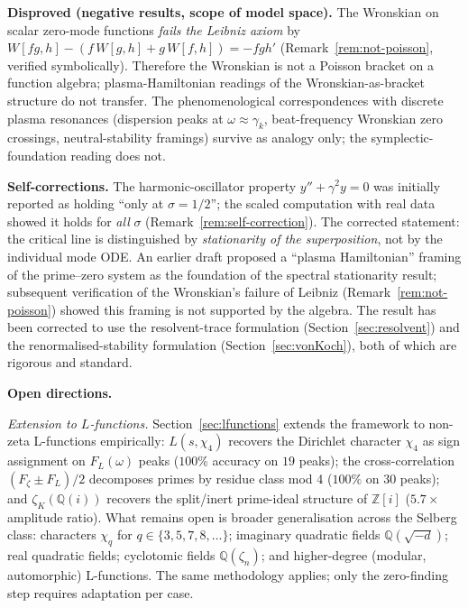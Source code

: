 \documentclass[11pt,a4paper]{article}
\theoremstyle{plain}
\theoremstyle{definition}
\theoremstyle{remark}
\begin{document}
\medskip
\noindent\textbf{Disproved (negative results, scope of model space).}
The Wronskian on scalar zero-mode functions \emph{fails the Leibniz
axiom} by $W[fg, h] - (f\,W[g,h] + g\,W[f,h]) = -fgh'$
(Remark~\ref{rem:not-poisson}, verified symbolically).  Therefore
the Wronskian is not a Poisson bracket on a function algebra;
plasma-Hamiltonian readings of the Wronskian-as-bracket structure do
not transfer.  The phenomenological correspondences with discrete
plasma resonances (dispersion peaks at $\omega \approx \gamma_k$,
beat-frequency Wronskian zero crossings, neutral-stability framings)
survive as analogy only; the symplectic-foundation reading does not.

\medskip
\noindent\textbf{Self-corrections.}
The harmonic-oscillator property $y'' + \gamma^2 y = 0$ was initially
reported as holding ``only at $\sigma = 1/2$''; the scaled computation
with real data showed it holds for \emph{all} $\sigma$ (Remark~\ref{rem:self-correction}).
The corrected statement: the critical line is distinguished by
\emph{stationarity of the superposition}, not by the individual mode ODE.
An earlier draft proposed a ``plasma Hamiltonian'' framing of the
prime--zero system as the foundation of the spectral stationarity
result; subsequent verification of the Wronskian's failure of Leibniz
(Remark~\ref{rem:not-poisson}) showed this framing is not supported
by the algebra.  The result has been corrected to use the
resolvent-trace formulation (Section~\ref{sec:resolvent}) and the
renormalised-stability formulation (Section~\ref{sec:vonKoch}), both
of which are rigorous and standard.

\medskip
\noindent\textbf{Open directions.}

\textit{Extension to $L$-functions.}
Section~\ref{sec:lfunctions} extends the framework to non-zeta L-functions
empirically: $L(s, \chi_4)$ recovers the Dirichlet character $\chi_4$ as
sign assignment on $F_L(\omega)$ peaks ($100\%$ accuracy on $19$ peaks);
the cross-correlation $(F_\zeta \pm F_L)/2$ decomposes primes by residue
class mod 4 ($100\%$ on $30$ peaks); and $\zeta_K(\mathbb{Q}(i))$ recovers
the split/inert prime-ideal structure of $\mathbb{Z}[i]$ ($5.7\times$ amplitude
ratio).  What remains open is broader generalisation across the Selberg
class: characters $\chi_q$ for $q \in \{3, 5, 7, 8, \ldots\}$;
imaginary quadratic fields $\mathbb{Q}(\sqrt{-d})$; real quadratic fields;
cyclotomic fields $\mathbb{Q}(\zeta_n)$; and higher-degree (modular,
automorphic) L-functions.  The same methodology applies; only the
zero-finding step requires adaptation per case.
\end{document}
